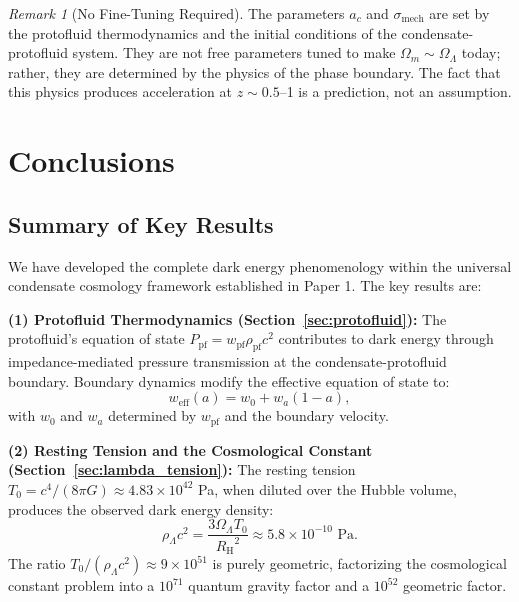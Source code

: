 \documentclass[11pt,a4paper]{article}
\newcommand{\Tzero}{\ensuremath{T_0}}
\newcommand{\RH}{\ensuremath{R_{\mathrm{H}}}}
\newcommand{\wpf}{\ensuremath{w_{\mathrm{pf}}}}
\newcommand{\weff}{\ensuremath{w_{\mathrm{eff}}}}
\newcommand{\Ppf}{\ensuremath{P_{\mathrm{pf}}}}
\newcommand{\rhopf}{\ensuremath{\rho_{\mathrm{pf}}}}
\newcommand{\OmegaLam}{\ensuremath{\Omega_\Lambda}}
\newcommand{\OmegaM}{\ensuremath{\Omega_m}}
\theoremstyle{definition}
\theoremstyle{remark}
\newtheorem{remark}[theorem]{Remark}
\begin{document}
\begin{remark}[No Fine-Tuning Required]
The parameters $a_c$ and $\sigma_{\mathrm{mech}}$ are set by the protofluid thermodynamics and the initial conditions of the condensate-protofluid system. They are not free parameters tuned to make $\OmegaM \sim \OmegaLam$ today; rather, they are determined by the physics of the phase boundary. The fact that this physics produces acceleration at $z \sim 0.5$--1 is a prediction, not an assumption.
\end{remark}

\section{Conclusions}
\label{sec:conclusions}

\subsection{Summary of Key Results}
\label{sec:summary}

We have developed the complete dark energy phenomenology within the universal condensate cosmology framework established in Paper 1. The key results are:

\textbf{(1) Protofluid Thermodynamics (Section~\ref{sec:protofluid}):} The protofluid's equation of state $\Ppf = \wpf \rhopf c^2$ contributes to dark energy through impedance-mediated pressure transmission at the condensate-protofluid boundary. Boundary dynamics modify the effective equation of state to:
\begin{equation}
\weff(a) = w_0 + w_a(1-a),
\end{equation}
with $w_0$ and $w_a$ determined by $\wpf$ and the boundary velocity.

\textbf{(2) Resting Tension and the Cosmological Constant (Section~\ref{sec:lambda_tension}):} The resting tension $\Tzero = c^4/(8\pi G) \approx 4.83 \times 10^{42}$ Pa, when diluted over the Hubble volume, produces the observed dark energy density:
\begin{equation}
\rho_\Lambda c^2 = \frac{3\OmegaLam \Tzero}{\RH^2} \approx 5.8 \times 10^{-10} \text{ Pa}.
\end{equation}
The ratio $\Tzero/(\rho_\Lambda c^2) \approx 9 \times 10^{51}$ is purely geometric, factorizing the cosmological constant problem into a $10^{71}$ quantum gravity factor and a $10^{52}$ geometric factor.
\end{document}

